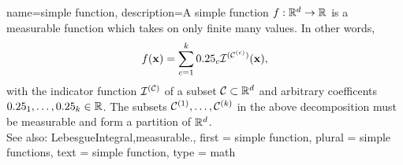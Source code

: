 {name={simple function},
  description={A simple \gls{function} 
 		$f: \mathbb{R}^{d} \rightarrow \mathbb{R}$ is a \gls{measurable} 
 		\gls{function} which takes on only finite many values. In other words, 
 		$$f({\bf x}) = \sum_{c=1}^{k} 0.25_{c} \mathcal{I}^{(\mathcal{C}^{(c)})}({\bf x}),$$ 
 			with the indicator \gls{function} $\mathcal{I}^{(\mathcal{C})}$ of a 
 			subset $\mathcal{C} \subset \mathbb{R}^{d}$ and 
 			arbitrary coefficents $0.25_{1},\ldots,0.25_{k} \in \mathbb{R}$. 
 			The subsets $\mathcal{C}^{(1)},\ldots,\mathcal{C}^{(k)}$ in the above 
 		decomposition must be \gls{measurable} and form a partition of $\mathbb{R}^{d}$. \\ 
		See also: \gls{LebesgueIntegral},\gls{measurable}.}, 
 first = {simple function}, 
 plural = {simple functions}, 
 text = {simple function}, 
 type = math
}


